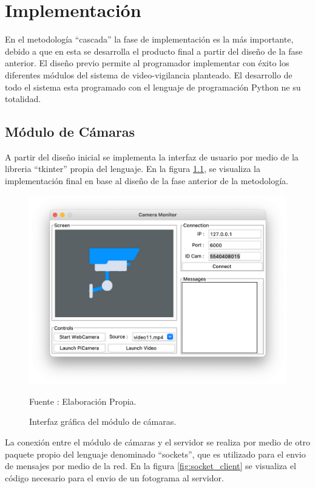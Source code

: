 \chapter{Implementación}
En el metodología ``cascada'' la fase de implementación es la más importante, debido a que en esta se desarrolla el producto final a partir del diseño de la fase anterior. El diseño previo permite al programador implementar con éxito los diferentes módulos del sistema de video-vigilancia planteado. El desarrollo de todo el sistema esta programado con el lenguaje de programación Python ne su totalidad.

\section{Módulo de Cámaras}
A partir del diseño inicial se implementa la interfaz de usuario por medio de la libreria ``tkinter'' propia del lenguaje. En la figura \ref{fig:camera_screen}, se visualiza la implementación final en base al diseño de la fase anterior de la metodología.

\begin{figure}[H]
    \begin{center}
        \includegraphics[width=12cm]{img/capitulo_5/camera_interface.png}
        \caption{Interfaz gráfica del módulo de cámaras.}
        Fuente : Elaboración Propia.
        \label{fig:camera_screen}
    \end{center}
\end{figure}

La conexión entre el módulo de cámaras y el servidor se realiza por medio de otro paquete propio del lenguaje denominado ``sockets'', que es utilizado para el envio de mensajes por medio de la red. En la figura \ref{fig:socket_client} se visualiza el código necesario para el envio de un fotograma al servidor.

